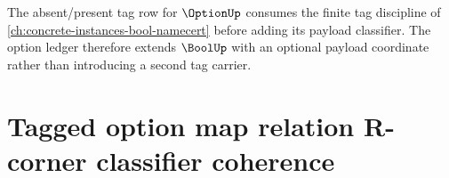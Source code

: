 





The absent/present tag row for $\OptionUp$ consumes the finite tag discipline
of \autoref{ch:concrete-instances-bool-namecert} before adding its payload
classifier. The option ledger therefore extends $\BoolUp$ with an optional
payload coordinate rather than introducing a second tag carrier.

\section{Tagged option map relation R-corner classifier coherence}
\label{sec:option-maprel-r-corner-classifier-coherence}

